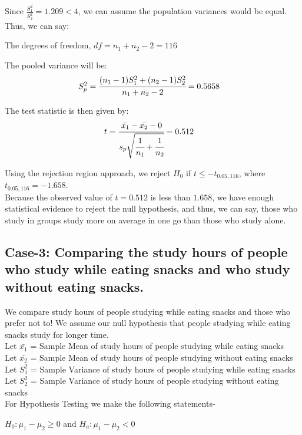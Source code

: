 \documentclass[12pt,onecolumn,letterpaper]{article}
\begin{document}
Since $\frac{S_1^2}{S_2^2} = 1.209 < 4$, we can assume the population variances would be equal. Thus, we can say: \par The degrees of freedom, $df = n_1 + n_2 -2 = 116$

 The pooled variance will be:
 \begin{align}
     S_p^2 &= \cfrac{(n_1-1)S_1^2 + (n_2-1)S_2^2}{n_1+n_2-2} = 0.5658
 \end{align}
      
     

The test statistic is then given by:
 \begin{align}
      t &= \cfrac{\bar{x_1} - \bar{x_2} - 0}{s_p\sqrt{\cfrac{1}{n_1} + \cfrac{1}{n_2}}} = 0.512
 \end{align}

 \par
 Using the rejection region approach, we reject $H_0$ if $t \leq -t_{0.05, 116}$, where $t_{0.05,116} = -1.658$.\\ 
 Because the observed value of $t=0.512$ is less than $1.658$, we have enough statistical evidence to reject the null hypothesis, and thus, we can say, those who study in groups study more on average in one go than those who study alone.
 
\subsection{Case-3: Comparing the study hours of people who study while eating snacks and who study without eating snacks.}
We compare study hours of people studying while eating snacks and those who prefer not to! We assume our null hypothesis that people studying while eating snacks study for longer time.\\

Let $\bar{x_1}$ = Sample Mean of study hours of people studying while eating snacks \\
Let $\bar{x_2}$ = Sample Mean of study hours of people studying without eating snacks \\
Let $S_1^2$ = Sample Variance of study hours of people studying while eating snacks \\
Let $S_2^2$ = Sample Variance of study hours of people studying without eating snacks \\ 



For Hypothesis Testing we make the following statements-
\begin{center}
    $ H_0 : \mu_1 - \mu_2 \geq 0$ and $H_a : \mu_1 - \mu_2 < 0$  \\
\end{center}
\end{document}
